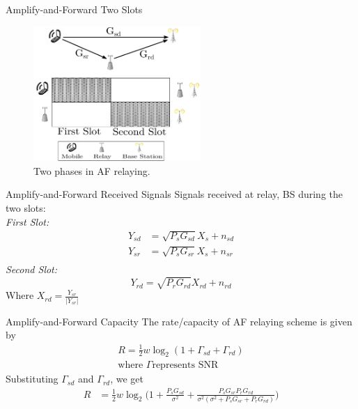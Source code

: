 \documentclass{beamer}
\begin{document}
\begin{frame}{Amplify-and-Forward } {Two Slots}
\begin{figure}
\centering
\includegraphics[width=2.5in]{../img/sysmodel.eps}
  \caption{Two phases in AF relaying.}
\end{figure}
\end{frame}

\begin{frame}{Amplify-and-Forward} {Received Signals}
\vspace{-1cm}
Signals received at relay, BS during the two slots: \\
	\textit{First Slot:}
	\begin{align*} 
			Y_{sd} &= \sqrt{P_s G_{sd}} X_s + n_{sd} \\
			Y_{sr} &= \sqrt{P_s G_{sr}} X_s + n_{sr} \\
	\end{align*}
	\textit{Second Slot:}
	\begin{equation*}\label{yrd}
			Y_{rd} = \sqrt{P_r G_{rd}} X_{rd} + n_{rd} 
	\end{equation*}
	Where $X_{rd} = \frac{Y_{sr}}{|Y_{sr}|}$ 
\end{frame}

\begin{frame}{Amplify-and-Forward} {Capacity}
\vspace{-1cm}
The rate/capacity of AF relaying scheme is given by
	\begin{align*}
			R = \frac{1}{2} w \log_2(1+\Gamma_{sd}+\Gamma_{rd}) 
				\\ \text{where $\Gamma$
				represents SNR}
	\end{align*}
	Substituting $\Gamma_{sd}$ and $\Gamma_{rd}$, we get 
	\begin{align*}
			R &= \frac{1}{2} w \log_2\bigg(1+\frac{P_s G_{sd}}{\sigma^2} +
				\frac{P_s G_{sr} P_r G_{rd}}{\sigma^2(\sigma^2 + P_sG_{sr} + P_rG_{rd})}\bigg)
	\end{align*}
\end{frame}
\end{document}
